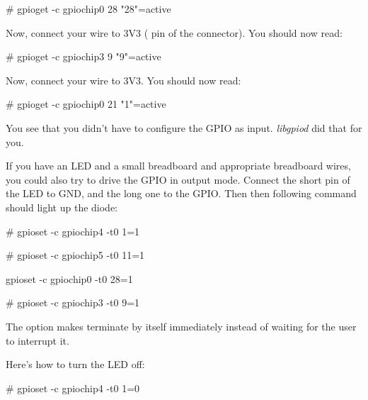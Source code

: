 \begin{bashinput}
# gpioget -c gpiochip0 28
"28"=active
\end{bashinput}
\fi

\if{}
Now, connect your wire to 3V3 ( pin  of the 
connector). You should now read:

\begin{bashinput}
# gpioget -c gpiochip3 9
"9"=active
\end{bashinput}
\fi

\if{}
Now, connect your wire to 3V3. You should now read:

\begin{bashinput}
# gpioget -c gpiochip0 21
"1"=active
\end{bashinput}
\fi

You see that you didn't have to configure the GPIO as input. {\em
libgpiod} did that for you.

If you have an LED and a small breadboard and appropriate breadboard
wires, you could also try to drive the GPIO in output mode. Connect
the short pin of the LED to GND, and the long one to the GPIO. Then
then following command should light up the diode:

\if{}
\begin{bashinput}
# gpioset -c gpiochip4 -t0 1=1
\end{bashinput}
\fi

\if{}
\begin{bashinput}
# gpioset -c gpiochip5 -t0 11=1
\end{bashinput}
\fi

\if{}
\begin{bashinput}
gpioset -c gpiochip0 -t0 28=1
\end{bashinput}
\fi

\if{}
\begin{bashinput}
# gpioset -c gpiochip3 -t0 9=1
\end{bashinput}
\fi

The  option makes  terminate by itself
immediately instead of waiting for the user to interrupt it.

Here's how to turn the LED off:

\if{}
\begin{bashinput}
# gpioset -c gpiochip4 -t0 1=0
\end{bashinput}
\fi

